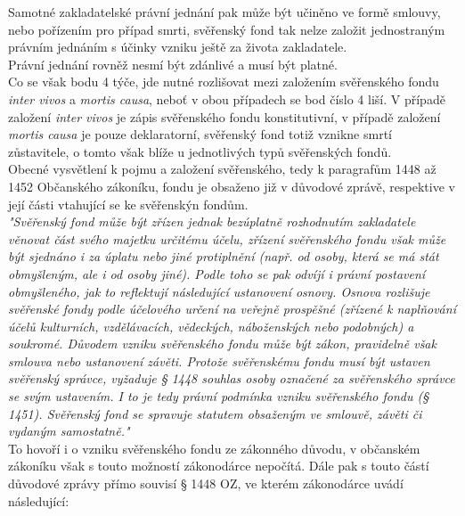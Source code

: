 \documentclass{article}
\begin{document}
Samotné zakladatelské právní jednání pak může být učiněno ve formě smlouvy, nebo pořízením pro případ smrti, svěřenský fond tak nelze založit jednostraným právním jednáním s účinky vzniku ještě za života zakladatele.\\

Právní jednání rovněž nesmí být zdánlivé a musí být platné.\\

Co se však bodu 4 týče, jde nutné rozlišovat mezi založením svěřenského fondu \textit{inter vivos} a \textit{mortis causa}, neboť v obou případech se bod číslo 4 liší. V případě založení \textit{inter vivos} je zápis svěřenského fondu konstitutivní, v případě založení \textit{mortis causa} je pouze deklaratorní, svěřenský fond totiž vznikne smrtí zůstavitele, o tomto však blíže u jednotlivých typů svěřenských fondů.\\

Obecné vysvětlení k pojmu a založení svěřenského, tedy k paragrafům 1448 až 1452 Občanského zákoníku, fondu je obsaženo již v důvodové zprávě, respektive v její části vtahující se ke svěřenskýn fondům.\\

\textit{"Svěřenský fond může být zřízen jednak bezúplatně rozhodnutím zakladatele věnovat část svého majetku určitému účelu, zřízení svěřenského fondu však může být sjednáno i za úplatu nebo jiné protiplnění (např. od osoby, která se má stát obmyšleným, ale i od osoby jiné). Podle toho se pak odvíjí i právní postavení obmyšleného, jak to reflektují následující ustanovení osnovy. Osnova rozlišuje svěřenské fondy podle účelového určení na veřejně prospěšné (zřízené k naplňování účelů kulturních, vzdělávacích, vědeckých, náboženských nebo podobných) a soukromé. Důvodem vzniku svěřenského fondu může být zákon, pravidelně však smlouva nebo ustanovení závěti. Protože svěřenskému fondu musí být ustaven svěřenský správce, vyžaduje § 1448 souhlas osoby označené za svěřenského správce se svým ustavením. I to je tedy právní podmínka vzniku svěřenského fondu (§ 1451). Svěřenský fond se spravuje statutem obsaženým ve smlouvě, závěti či vydaným samostatně."}\\

To hovoří i o vzniku svěřenského fondu ze zákonného důvodu, v občanském zákoníku však s touto možností zákonodárce nepočítá. Dále pak s touto částí důvodové zprávy přímo souvisí § 1448 OZ, ve kterém zákonodárce uvádí následující:\\
\end{document}
